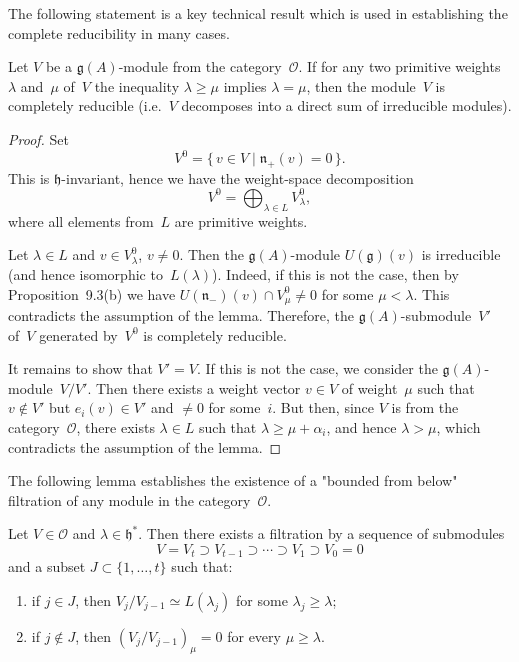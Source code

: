 \documentclass[12pt]{article}
\begin{document}
The following statement is a key technical result which is used in establishing the complete reducibility in many cases.
\begin{lemma}[9.5]
Let $V$ be a $\mathfrak{g}(A)$-module from the category~$\mathcal{O}$.
If for any two primitive weights $\lambda$ and~$\mu$ of~$V$
the inequality $\lambda \ge \mu$ implies $\lambda = \mu$,
then the module~$V$ is completely reducible
(i.e.\ $V$ decomposes into a direct sum of irreducible modules).
\end{lemma}

\begin{proof}
Set 
\[
V^0 = \{\,v \in V \mid \mathfrak{n}_+(v) = 0\,\}.
\]
This is $\mathfrak{h}$-invariant, hence we have the weight-space decomposition
\[
V^0 = \bigoplus_{\lambda \in L} V^0_\lambda,
\]
where all elements from~$L$ are primitive weights.  

Let $\lambda \in L$ and $v \in V^0_\lambda$, $v \ne 0$.
Then the $\mathfrak{g}(A)$-module $U(\mathfrak{g})(v)$ is irreducible 
(and hence isomorphic to~$L(\lambda)$).
Indeed, if this is not the case, then by Proposition~9.3(b) we have
$U(\mathfrak{n}_-)(v) \cap V^0_\mu \ne 0$ for some $\mu < \lambda$.
This contradicts the assumption of the lemma.  
Therefore, the $\mathfrak{g}(A)$-submodule~$V'$ of~$V$ generated by~$V^0$
is completely reducible.

It remains to show that $V' = V$.  
If this is not the case, we consider the $\mathfrak{g}(A)$-module~$V/V'$.
Then there exists a weight vector $v \in V$ of weight~$\mu$
such that $v \notin V'$ but $e_i(v) \in V'$ and $\ne 0$ for some~$i$.
But then, since $V$ is from the category~$\mathcal{O}$,
there exists $\lambda \in L$ such that $\lambda \ge \mu + \alpha_i$, 
and hence $\lambda > \mu$, which contradicts the assumption of the lemma.
\end{proof}

The following lemma establishes the existence of a "bounded from below" filtration of any module in the category~$\mathcal{O}$.
\begin{lemma}[9.6]
Let $V \in \mathcal{O}$ and $\lambda \in \mathfrak{h}^*$. Then there exists a filtration
by a sequence of submodules
\[
V = V_t \supset V_{t-1} \supset \cdots \supset V_1 \supset V_0 = 0
\]
and a subset $J \subset \{1,\dots,t\}$ such that:
\begin{enumerate}[label=\textup{(\roman*)}]
    \item if $j \in J$, then $V_j/V_{j-1} \simeq L(\lambda_j)$ for some $\lambda_j \ge \lambda$;
    \item if $j \notin J$, then $(V_j/V_{j-1})_\mu = 0$ for every $\mu \ge \lambda$.
\end{enumerate}
\end{lemma}
\end{document}
